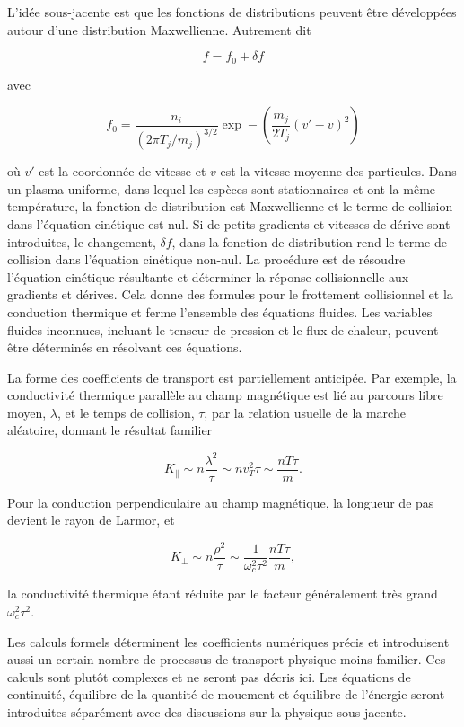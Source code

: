 \documentclass[main.tex]{subfiles}
\begin{document}
L'idée sous-jacente est que les fonctions de distributions peuvent être développées autour d'une distribution Maxwellienne.
Autrement dit

\[
	f = f_0 + \delta f
\]

\nit avec

\[
	f_0 = \frac{n_i}{\left( 2 \pi T_j / m_j \right)^{3/2}} \exp - \left( \frac{m_j}{2 T_j} \left( v' - v\right)^2 \right)
\]

\nit où \( v' \) est la coordonnée de vitesse et \( v \) est la vitesse moyenne des particules.
Dans un plasma uniforme, dans lequel les espèces sont stationnaires et ont la même température, la fonction de distribution est Maxwellienne et le terme de collision dans l'équation cinétique est nul.
Si de petits gradients et vitesses de dérive sont introduites, le changement, \( \delta f \), dans la fonction de distribution rend le terme de collision dans l'équation cinétique non-nul.
La procédure est de résoudre l'équation cinétique résultante et déterminer la réponse collisionnelle aux gradients et dérives.
Cela donne des formules pour le frottement collisionnel et la conduction thermique et ferme l'ensemble des équations fluides.
Les variables fluides inconnues, incluant le tenseur de pression et le flux de chaleur, peuvent être déterminés en résolvant ces équations.

La forme des coefficients de transport est partiellement anticipée.
Par exemple, la conductivité thermique parallèle au champ magnétique est lié au parcours libre moyen, \( \lambda \), et le temps de collision, \( \tau \), par la relation usuelle de la marche aléatoire, donnant le résultat familier

\[
	K_\parallel \sim n \frac{\lambda^2}{\tau} \sim n v_T^2 \tau \sim \frac{n T \tau}{m}.
\]

\nit Pour la conduction perpendiculaire au champ magnétique,  la longueur de pas devient le rayon de Larmor, et

\[
	K_\perp \sim n \frac{\rho^2}{\tau} \sim \frac{1}{\omega_c^2 \tau^2} \frac{n T \tau}{m},
\]

\nit la conductivité thermique étant réduite par le facteur généralement très grand \( \omega_c^2 \tau^2 \).

Les calculs formels déterminent les coefficients numériques précis et introduisent aussi un certain nombre de processus de transport physique moins familier.
Ces calculs sont plutôt complexes et ne seront pas décris ici.
Les équations de continuité, équilibre de la quantité de mouement et équilibre de l'énergie seront introduites séparément avec des discussions sur la physique sous-jacente.
\end{document}
